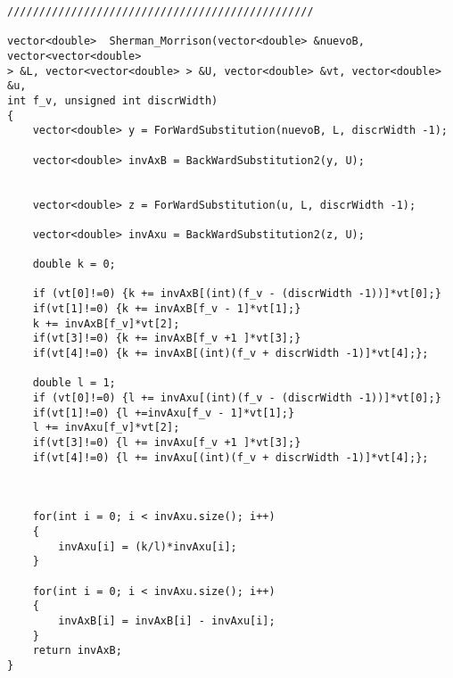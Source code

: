 \begin{verbatim}
////////////////////////////////////////////////

vector<double>  Sherman_Morrison(vector<double> &nuevoB, vector<vector<double>
> &L, vector<vector<double> > &U, vector<double> &vt, vector<double> &u, 
int f_v, unsigned int discrWidth)
{
    vector<double> y = ForWardSubstitution(nuevoB, L, discrWidth -1); 

    vector<double> invAxB = BackWardSubstitution2(y, U); 


    vector<double> z = ForWardSubstitution(u, L, discrWidth -1);

    vector<double> invAxu = BackWardSubstitution2(z, U); 
	
    double k = 0;

    if (vt[0]!=0) {k += invAxB[(int)(f_v - (discrWidth -1))]*vt[0];} 
    if(vt[1]!=0) {k += invAxB[f_v - 1]*vt[1];}
    k += invAxB[f_v]*vt[2];
    if(vt[3]!=0) {k += invAxB[f_v +1 ]*vt[3];} 
    if(vt[4]!=0) {k += invAxB[(int)(f_v + discrWidth -1)]*vt[4];}; 

    double l = 1;
    if (vt[0]!=0) {l += invAxu[(int)(f_v - (discrWidth -1))]*vt[0];} 
    if(vt[1]!=0) {l +=invAxu[f_v - 1]*vt[1];}
    l += invAxu[f_v]*vt[2]; 
    if(vt[3]!=0) {l += invAxu[f_v +1 ]*vt[3];} 
    if(vt[4]!=0) {l += invAxu[(int)(f_v + discrWidth -1)]*vt[4];};

	

    for(int i = 0; i < invAxu.size(); i++)
	{
        invAxu[i] = (k/l)*invAxu[i];
	}
	
    for(int i = 0; i < invAxu.size(); i++)
	{
        invAxB[i] = invAxB[i] - invAxu[i];
	}
    return invAxB;
}


\end{verbatim}





